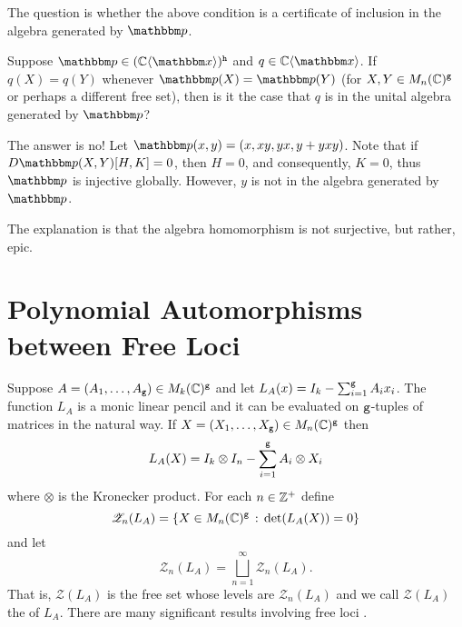 The question is whether the above condition is a certificate of inclusion in the algebra generated by $\bbp$.

\begin{problem}
	Suppose $\bbp\in (\C\fralg{\bbx})^\tth$ and $q\in \C\fralg{\bbx}$.
	If $q(X) = q(Y)$ whenever $\bbp(X) = \bbp(Y)$ (for $X,Y\in M_n(\mathbb{C})^{\texttt{g}}$ or perhaps a different free set), then is it the case that $q$ 
	is in the unital algebra generated by $\bbp$?
\end{problem}

The answer is no! Let $\bbp(x,y) = (x, xy, yx, y + yxy)$.
Note that if $D\bbp(X,Y)[H,K] = 0$, then $H = 0$, and consequently, $K=0$, thus $\bbp$ is injective globally.
However, $y$ is not in the algebra generated by $\bbp$.

The explanation is that the algebra homomorphism is not surjective, but rather, epic.


%
%

%


\section{Polynomial Automorphisms between Free Loci}

Suppose $A = (A_1,\dots, A_{\texttt{g}})\in M_k(\mathbb{C})^{\texttt{g}}$ and let $L_A(x) = I_k - \sum_{i=1}^{\texttt{g}} A_ix_i$.
The function $L_A$ is a monic linear pencil and it can be evaluated on ${\texttt{g}}$-tuples of matrices in the natural way.
If $X = (X_1,\dots, X_{\texttt{g}})\in M_n(\mathbb{C})^{\texttt{g}}$ then
\[
	L_A(X) = I_k\otimes I_n - \sum_{i=1}^{\texttt{g}} A_i\otimes X_i
\]
where $\otimes$ is the Kronecker product. For each $n\in \mathbb{Z}^+$ define
\[
	\mathscr{Z}_n(L_A) = {\left\{X\in M_n(\mathbb{C})^{\texttt{g}} \, : \, \det(L_A(X)) = 0\right\}}
\]
and let
\[
	\mathscr{Z}_n(L_A) = \bigsqcup_{n=1}^\infty \mathscr{Z}_n(L_A).
\]
That is, $\mathscr{Z}(L_A)$ is the free set whose levels are $\mathscr{Z}_n(L_A)$ and we call $\mathscr{Z}(L_A)$ the  of $L_A$.
There are many significant results involving free loci \cite{KlVol17}.

